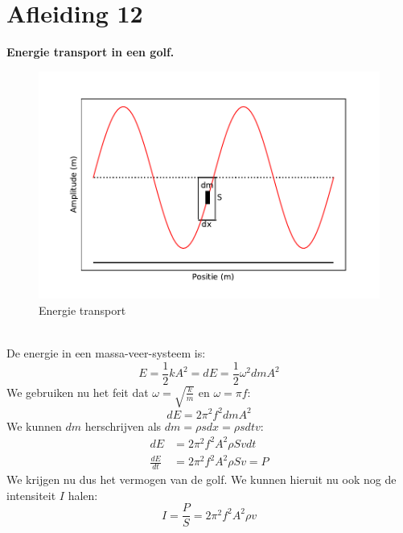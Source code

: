 \documentclass[a4paper,kul]{kulakarticle} %
\begin{document}
\section{Afleiding 12}
\textbf{Energie transport in een golf.}\\
\begin{figure}[h]
	\centering
	\includegraphics[width=0.7\linewidth]{EnergieGolf}
	\caption[Energie transport]{Energie transport}
	\label{fig:energietransport}
\end{figure}\\
De energie in een massa-veer-systeem is:
\begin{equation*}
	E = \frac{1}{2}kA^2 = dE = \frac{1}{2}\omega^2dmA^2
\end{equation*}
We gebruiken nu het feit dat $\omega = \sqrt{\frac{k}{m}} $ en $\omega = \pi f$:
\begin{equation*}
	dE = 2\pi^2f^2dmA^2
\end{equation*}
We kunnen $dm$ herschrijven als $dm = \rho sdx = \rho sdtv$:
\begin{align*}
	dE &= 2\pi^2f^2A^2\rho Svdt\\
	\frac{dE}{dt} &= 2\pi^2f^2A^2\rho Sv = P
\end{align*}
We krijgen nu dus het vermogen van de golf. We kunnen hieruit nu ook nog de intensiteit $I$ halen:
\begin{equation*}
	I = \frac{P}{S} = 2\pi^2f^2A^2\rho v
\end{equation*}
\newpage
\end{document}
